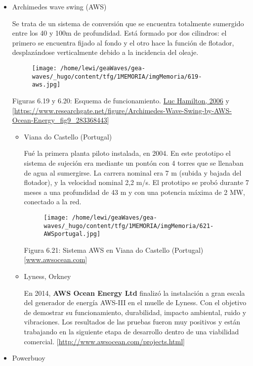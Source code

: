 \documentclass[]{article}
\begin{document}
\begin{itemize}
\item
  Archimedes wave swing (AWS)

  Se trata de un sistema de conversión que se encuentra totalmente
  sumergido entre los 40 y 100m de profundidad. Está formado por dos
  cilindros: el primero se encuentra fijado al fondo y el otro hace la
  función de flotador, desplazándose verticalmente debido a la
  incidencia del oleaje.

  \begin{figure}
  \centering
  \texttt{[image: /home/lewi/geaWaves/gea-waves/\_hugo/content/tfg/1MEMORIA/imgMemoria/619-aws.jpg]}
  \caption{}
  \end{figure}

  Figuras 6.19 y 6.20: Esquema de funcionamiento.
  \href{www.awsocean.com}{Luc Hamilton, 2006} y
  {[}\url{https://www.researchgate.net/figure/Archimedes-Wave-Swing-by-AWS-Ocean-Energy_fig9_283368443}{]}

  \begin{itemize}
  \item
    Viana do Castello (Portugal)

    Fué la primera planta piloto instalada, en 2004. En este prototipo
    el sistema de sujeción era mediante un pontón con 4 torres que se
    llenaban de agua al sumergirse. La carrera nominal era 7 m (subida y
    bajada del flotador), y la velocidad nominal 2,2 m/s. El prototipo
    se probó durante 7 meses a una profundidad de 43 m y con una
    potencia máxima de 2 MW, conectado a la red.

    \begin{figure}
    \centering
    \texttt{[image: /home/lewi/geaWaves/gea-waves/\_hugo/content/tfg/1MEMORIA/imgMemoria/621-AWSportugal.jpg]}
    \caption{}
    \end{figure}

    Figura 6.21: Sistema AWS en Viana do Castello
    (Portugal){[}\url{www.awsocean.com}{]} 
  \item
    Lyness, Orkney

    En 2014, \textbf{AWS Ocean Energy Ltd} finalizó la instalación a
    gran escala del generador de energía AWS-III en el muelle de Lyness.
    Con el objetivo de demostrar su funcionamiento, durabilidad, impacto
    ambiental, ruido y vibraciones. Los resultados de las pruebas fueron
    muy positivos y están trabajando en la siguiente etapa de desarrollo
    dentro de una viabilidad comercial.
    {[}\url{http://www.awsocean.com/projects.html}{]}
  \end{itemize}
\item
  Powerbuoy


\end{itemize}
\end{document}
